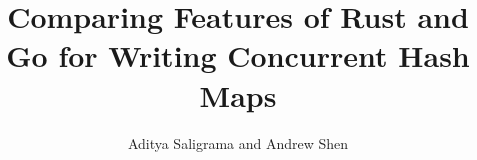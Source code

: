 \documentclass{article}
\begin{document}
\title{Comparing Features of Rust and Go for Writing Concurrent Hash Maps}

\author{Aditya Saligrama and Andrew Shen}

\maketitle








\end{document}
